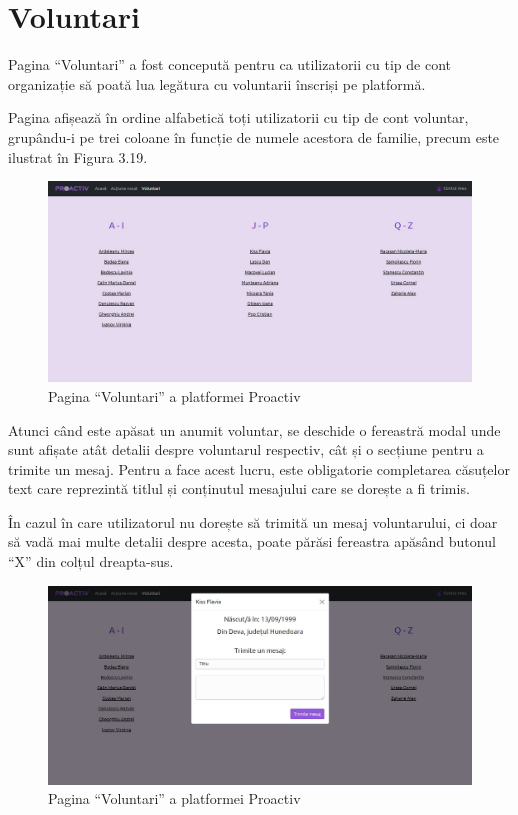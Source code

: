 \documentclass[12pt,a4paper]{report}
\begin{document}
\section{Voluntari}
\par
Pagina “Voluntari” a fost concepută pentru ca utilizatorii cu tip de cont organizație să poată lua legătura cu voluntarii înscriși pe platformă.
\\ \par
Pagina afișează în ordine alfabetică toți utilizatorii cu tip de cont voluntar, grupându-i pe trei coloane în funcție de numele acestora de familie, precum este ilustrat în Figura 3.19.
\begin{figure}[H]
\centering
  \includegraphics[width=0.95\linewidth]{./imagini/vol1.jpg}
  \caption{Pagina “Voluntari” a platformei Proactiv}
\end{figure}
\par
Atunci când este apăsat un anumit voluntar, se deschide o fereastră modal unde sunt afișate atât detalii despre voluntarul respectiv, cât și o secțiune pentru a trimite un mesaj. Pentru a face acest lucru, este obligatorie completarea căsuțelor text care reprezintă titlul și conținutul mesajului care se dorește a fi trimis.
\par
În cazul în care utilizatorul nu dorește să trimită un mesaj voluntarului, ci doar să vadă mai multe detalii despre acesta, poate părăsi fereastra apăsând butonul “X” din colțul dreapta-sus.
\begin{figure}[H]
\centering
  \includegraphics[width=0.95\linewidth]{./imagini/vol2.jpg}
  \caption{Pagina “Voluntari” a platformei Proactiv}
\end{figure}
\end{document}
